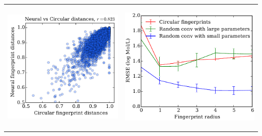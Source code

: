 \documentclass[landscape,a0b,final,a4resizeable]{include/a0poster}
\begin{document}
\begin{poster}
\begin{multicols}{3}
\begin{tabular}{cc}
\begin{minipage}[c]{0.48\columnwidth}
\includegraphics[width=\columnwidth]{figures/fig_2.pdf}
\end{minipage} & 
\begin{minipage}[c]{0.48\columnwidth}
\begin{center}
\vspace{0.5cm}\includegraphics[width=\columnwidth]{figures/fig_3.pdf}
\end{center}
\end{minipage}
\end{tabular}


\end{multicols}
\end{poster}
\end{document}
